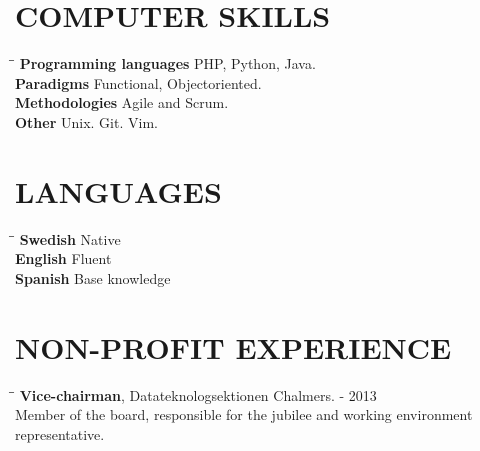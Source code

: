 \documentclass[11pt]{res}
\begin{document}
\begin{resume}
\section{COMPUTER SKILLS}          
\vspace{-0.1in}	
	\begin{tabbing}
		\hspace{2.3in}\= \hspace{2.6in}\= \kill %
		{\bf Programming languages} \> PHP, Python, Java. \\
		{\bf Paradigms} \> Functional, Objectoriented. \\
		{\bf Methodologies} \> Agile and Scrum. \\
		{\bf Other} \> Unix. Git. Vim.  
	\end{tabbing}                   


\section{LANGUAGES}     
\vspace{-0.1in}	
	\begin{tabbing}
		\hspace{2.3in}\= \hspace{2.6in}\= \kill %
		{\bf Swedish} \> Native \\
		{\bf English} \> Fluent \\    
		{\bf Spanish} \> Base knowledge
	\end{tabbing}       


\section{NON-PROFIT EXPERIENCE}  
\vspace{-0.1in}	
	\begin{tabbing}
		\hspace{2.3in}\= \hspace{2.6in}\= \kill %
		{\bf  Vice-chairman}, Datateknologsektionen Chalmers. \>  - 2013\\
		Member of the board, responsible for the jubilee and working environment representative.
	\end{tabbing}
\vspace{-30pt}


\end{resume}
\end{document}

